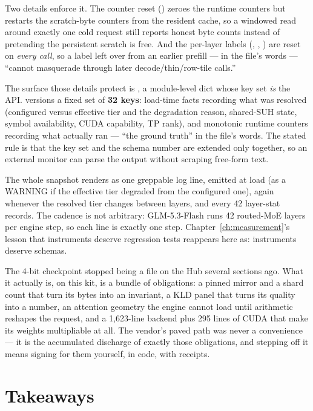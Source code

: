 Two details enforce it. The counter reset
() zeroes the runtime counters but
restarts the scratch-byte counters from the resident cache, so a windowed
read around exactly one cold request still reports honest byte counts
instead of pretending the persistent scratch is free. And the per-layer
labels (, ,
) are reset on \emph{every call}, so a
 label left over from an earlier prefill --- in the file's
words --- ``cannot masquerade through later decode/thin/row-tile calls.''

The surface those details protect is , a module-level
dict whose key set \emph{is} the API. 
versions a fixed set of \textbf{32 keys}: load-time facts recording what
was resolved (configured versus effective tier and the degradation reason,
shared-SUH state, symbol availability, CUDA capability, TP rank), and
monotonic runtime counters recording what actually ran --- ``the ground
truth'' in the file's words. The stated rule is that the key set and the
schema number are extended only together, so an external monitor can parse
the output without scraping free-form text.

The whole snapshot renders as one greppable log line, emitted at load (as a
WARNING if the effective tier degraded from the configured one), again
whenever the resolved tier changes between layers, and every 42 layer-stat
records. The cadence is not arbitrary: GLM-5.3-Flash runs 42 routed-MoE
layers per engine step, so each line is exactly one step.
Chapter~\ref{ch:measurement}'s lesson that
instruments deserve regression tests reappears here as: instruments deserve
schemas.

\FloatBarrier

The 4-bit checkpoint stopped being a file on the Hub several sections ago.
What it actually is, on this kit, is a bundle of obligations: a pinned
mirror and a shard count that turn its bytes into an invariant, a KLD panel
that turns its quality into a number, an attention geometry the engine
cannot load until arithmetic reshapes the request, and a 1{,}623-line
backend plus 295 lines of CUDA that make its weights multipliable at all.
The vendor's paved path was never a convenience --- it is the accumulated
discharge of exactly those obligations, and stepping off it means signing
for them yourself, in code, with receipts.

\section*{Takeaways}

